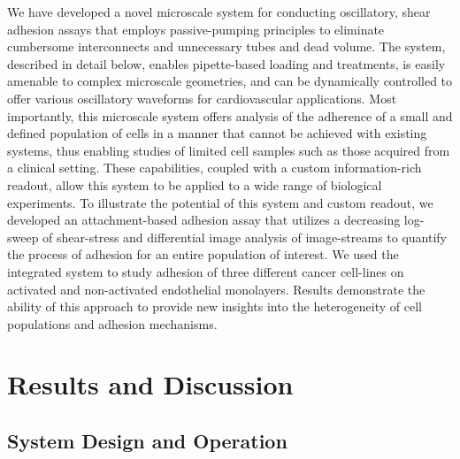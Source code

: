 We have developed a novel microscale system for conducting oscillatory, shear adhesion assays that employs passive-pumping principles to eliminate cumbersome interconnects and unnecessary tubes and dead volume. The system, described in detail below, enables pipette-based loading and treatments, is easily amenable to complex microscale geometries, and can be dynamically controlled to offer various oscillatory waveforms for cardiovascular applications. Most importantly, this microscale system offers analysis of the adherence of a small and defined population of cells in a manner that cannot be achieved with existing systems, thus enabling studies of limited cell samples such as those acquired from a clinical setting. These capabilities, coupled with a custom information-rich readout, allow this system to be applied to a wide range of biological experiments. To illustrate the potential of this system and custom readout, we developed an attachment-based adhesion assay that utilizes a decreasing log-sweep of shear-stress and differential image analysis of image-streams to quantify the process of adhesion for an entire population of interest. We used the integrated system to study adhesion of three different cancer cell-lines on activated and non-activated endothelial monolayers. Results demonstrate the ability of this approach to provide new insights into the heterogeneity of cell populations and adhesion mechanisms.

\section{Results and Discussion}

\subsection{System Design and Operation}

